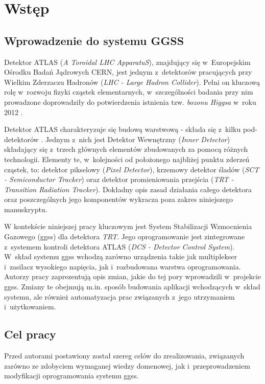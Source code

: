 \chapter{Wstęp}
\label{cha:wstep}

\section{Wprowadzenie do systemu GGSS}
Detektor ATLAS (\textit{A Toroidal LHC ApparatuS}), znajdujący się w~Europejskim Ośrodku Badań Jądrowych CERN, jest jednym z~detektorów pracujących przy Wielkim Zderzaczu Hadronów (\textit{LHC - Large Hadron Collider}). Pełni on kluczową rolę w~rozwoju fizyki cząstek elementarnych, w~szczególności badania przy nim prowadzone doprowadziły do potwierdzenia istnienia tzw. \textit{bozonu Higgsa} w~roku 2012 \cite{AtlasWikipedia}. \par

Detektor ATLAS charakteryzuje się budową warstwową - składa się z~kilku pod-detektorów \cite{AtlasAGH}. Jednym z~nich jest Detektor Wewnętrzny (\textit{Inner Detector}) składający się z~trzech głównych elementów zbudowanych za pomocą różnych technologii. Elementy te, w~kolejności od położonego najbliżej punktu zderzeń cząstek, to: detektor pikselowy (\textit{Pixel Detector}), krzemowy detektor śladów (\textit{SCT - Semiconductor Tracker}) oraz detektor promieniowania przejścia (\textit{TRT - Transition Radiation Tracker}). Dokładny opis zasad działania całego detektora oraz poszczególnych jego komponentów wykracza poza zakres niniejszego manuskryptu.\par

W kontekście niniejszej pracy kluczowym jest System Stabilizacji Wzmocnienia Gazowego (\gls*{ggss}) dla detektora \textit{TRT}. Jego oprogramowanie jest zintegrowane \cite{AtlasAGH} z~systemem kontroli detektora ATLAS (\textit{DCS - Detector Control System}). W~skład systemu \gls*{ggss} wchodzą zarówno urządzenia takie jak multiplekser i~zasilacz wysokiego napięcia, jak i~rozbudowana warstwa oprogramowania. Autorzy pracy zaprezentują opis zmian, jakie do tej pory wprowadzili w~projekcie \gls*{ggss}. Zmiany te obejmują m.in. sposób budowania aplikacji wchodzących w~skład systemu, ale również automatyzacja prac związanych z~jego utrzymaniem i~użytkowaniem.



\section{Cel pracy}
Przed autorami postawiony został szereg celów do zrealizowania, związanych zarówno ze zdobyciem wymaganej wiedzy domenowej, jak i~przeprowadzeniem modyfikacji oprogramowania systemu \gls*{ggss}. \par


